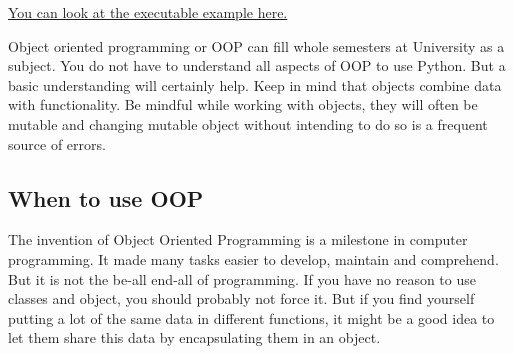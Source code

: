 \documentclass{article}
\begin{document}
\href{http://pythontutor.com/visualize.html#code=class%20Car%28%29%3A%0A%0A%20%20%20%20horn_sound%3A%20str%20%3D%20%22Honk!%22%0A%20%20%20%20_speed%3A%20float%20%3D%200.0%0A%0A%20%20%20%20def%20__init__%28self,%20horn_sound%3A%20str%20%3D%20None%29%3A%0A%20%20%20%20%20%20%20%20if%20horn_sound%3A%0A%20%20%20%20%20%20%20%20%20%20%20%20self.horn_sound%20%3D%20horn_sound%0A%0A%20%20%20%20def%20accelerate%28self,%20kmh%3A%20float%20%3D%200.0%29%3A%0A%20%20%20%20%20%20%20%20self._speed%20%3D%20self._speed%20%2B%20kmh%0A%0A%20%20%20%20def%20brake%28self,%20target_kmh%3A%20float%20%3D%200.0%29%3A%0A%20%20%20%20%20%20%20%20if%20target_kmh%20%3C%20self._speed%3A%0A%20%20%20%20%20%20%20%20%20%20%20%20self._speed%20%3D%20float%28target_kmh%29%0A%0A%20%20%20%20def%20honk%28self%29%3A%0A%20%20%20%20%20%20%20%20print%28self.horn_sound%29%0A%0A%20%20%20%20%40property%0A%20%20%20%20def%20speed%28self%29%3A%0A%20%20%20%20%20%20%20%20return%20f%22%7Bself._speed%7D%20km/h%22%0A%20%20%20%20%20%20%20%20%0Amy_car%20%3D%20Car%28%29%0Ayour_car%20%3D%20Car%28%22Biep!%22%29%0A%0Amy_car.accelerate%2830%29%0Ayour_car.accelerate%2840%29%0A%0Aprint%28my_car.speed%29%0Aprint%28your_car.speed%29%0A%0Amy_car.honk%28%29%0Ayour_car.brake%2830%29%0Ayour_car.honk%28%29%0A%0Aprint%28my_car.speed%29%0Aprint%28your_car.speed%29%0A&cumulative=false&curInstr=47&heapPrimitives=nevernest&mode=display&origin=opt-frontend.js&py=3&rawInputLstJSON=%5B%5D&textReferences=false}{You can look at the executable example here.}

Object oriented programming or OOP can fill whole semesters at University as a subject.
You do not have to understand all aspects of OOP to use Python.
But a basic understanding will certainly help.
Keep in mind that objects combine data with functionality.
Be mindful while working with objects, they will often be mutable and
changing mutable object without intending to do so is a frequent source of errors.

\subsection{When to use OOP}

The invention of Object Oriented Programming is a milestone in computer programming.
It made many tasks easier to develop, maintain and comprehend.
But it is not the be-all end-all of programming.
If you have no reason to use classes and object, you should probably not force it.
But if you find yourself putting a lot of the same data in different functions,
it might be a good idea to let them share this data by encapsulating them
in an object.
\end{document}
